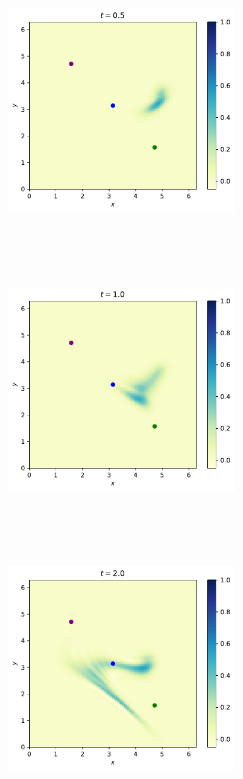 \documentclass{article}
\begin{document}
\begin{figure}[H]
	\begin{subfigure}{0.5\linewidth}
		\includegraphics[width=6cm, height=6cm]{img/LFDM0_5s.pdf}
		\centering
		\caption{}
		\label{fig:tau}
	\end{subfigure}
	~
	\begin{subfigure}{0.5\linewidth}
		\includegraphics[width=6cm, height=6cm]{img/LFDM1s.pdf}
		\centering
		\caption{}
		\label{fig:tau}
	\end{subfigure}
	~
	\begin{subfigure}{0.5\linewidth}
		\includegraphics[width=6cm, height=6cm]{img/LFDM2s.pdf}
		\centering
		\caption{}
		\label{fig:tau}
	\end{subfigure}
	~
	\begin{subfigure}{0.5\linewidth}

\end{subfigure}
\end{figure}
\end{document}
